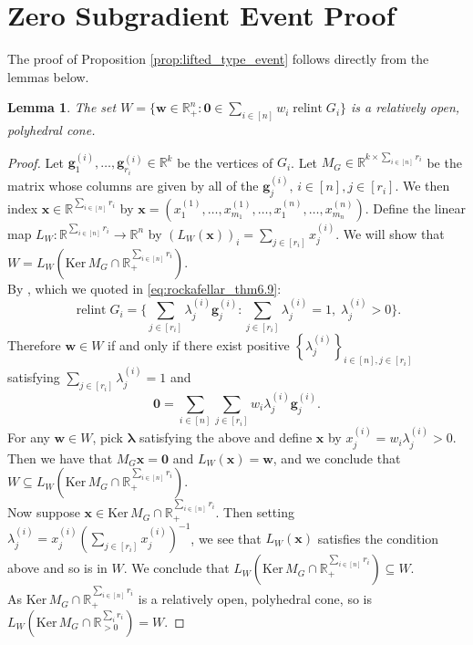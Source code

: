 \documentclass[10pt]{article}
\newtheorem{lemma}[theorem]{Lemma}
\theoremstyle{definition}
\theoremstyle{remark}
\newcommand{\R}{\mathbb{R}}
\newcommand{\Ker}{\mathrm{Ker} \,}
\DeclareMathOperator{\relint}{relint}
\renewcommand{\vec}[1]{\mathbf{#1}}
\begin{document}
	
	
	\pagebreak
	
	\appendix
	
	\section{Zero Subgradient Event Proof} \label{appsec:prop_proof}
	
	\EventEquivalence*
	
	The proof of Proposition \ref{prop:lifted_type_event} follows directly from the lemmas below.
	
	\begin{lemma}\label{lemma:polyhedral_cone_W}
		The set $W = \{\vec w \in \R^n_{+} : \vec 0 \in \sum_{i \in [n]} w_i \relint G_i\}$ is a relatively open, polyhedral cone.
	\end{lemma}
	
	\begin{proof}
		Let $\vec g_1^{(i)}, \dots, \vec g_{r_i}^{(i)} \in \R^k$ be the vertices of $G_i$. Let $M_G \in \R^{k \times \sum_{i \in [n]} r_i}$ be the matrix whose columns are given by all of the $\vec g_j^{(i)}, \, i\in [n], j \in [r_i]$. We then index $\vec x \in  \R^{\sum_{i \in [n]} r_i}$ by $\vec x = (x_1^{(1)},\ldots,x_{m_1}^{(1)},\ldots,x_{1}^{(n)},\ldots,x^{(n)}_{m_n})$. Define the linear map $L_W: \R^{\sum_{i \in [n]} r_i} \rightarrow \R^n$ by $\left(L_W(\vec x)\right)_i = \sum_{j \in [r_i]} x_j^{(i)}$. We will show that $W = L_W(\Ker M_G \cap \R^{\sum_{i \in [n]} r_i}_{+})$. \\
		By \cite[Theorem 6.9]{rockafellar1970convex}, which we quoted in \cref{eq:rockafellar_thm6.9}:
		\[
		\relint G_i = \bigg\{ \textstyle \sum_{j \in [r_i]} \lambda^{(i)}_{j} \vec g_j^{(i)} : \sum_{j \in [r_i]} \lambda^{(i)}_j = 1,\; \lambda^{(i)}_j > 0 \bigg\}.
		\]
		Therefore $\vec w \in W$ if and only if there exist positive $\left\{\lambda^{(i)}_j\right\}_{i \in [n], j \in [r_i]}$ satisfying $\sum_{j \in [r_i]} \lambda_j^{(i)} = 1$ and 
		\[
		\vec 0 = \textstyle \sum_{i \in [n]} \sum_{j \in [r_i]} w_i \lambda^{(i)}_j \vec g_j^{(i)}.
		\]
		For any $\vec w \in W$, pick $\vec \lambda$ satisfying the above and define $\vec x$ by $x_j^{(i)} = w_i\lambda_j^{(i)} > 0$. Then we have that $M_G \vec x = \vec 0$ and $L_W(\vec x) = \vec w$, and we conclude that $W \subseteq L_W(\Ker M_G \cap \R^{\sum_{i \in [n]} r_i}_{+})$. \\
		Now suppose $\vec x \in \Ker M_G \cap \R^{\sum_{i \in [n]} r_i}_{+}$. Then setting $\lambda_j^{(i)} = x_j^{(i)}\left(\sum_{j \in [r_i]} x_j^{(i)}\right)^{-1}$, we see that $L_W(\vec x)$ satisfies the condition above and so is in $W$. We conclude that $L_W(\Ker M_G \cap \R^{\sum_{i \in [n]} r_i}_{+}) \subseteq W$. \\
		As $\Ker M_G \cap \R^{\sum_{i \in [n]} r_i}_{+}$ is a relatively open, polyhedral cone, so is $L_W(\Ker M_G \cap \R^{\sum_i r_i}_{>0}) = W$.
	\end{proof}
	
\end{document}
